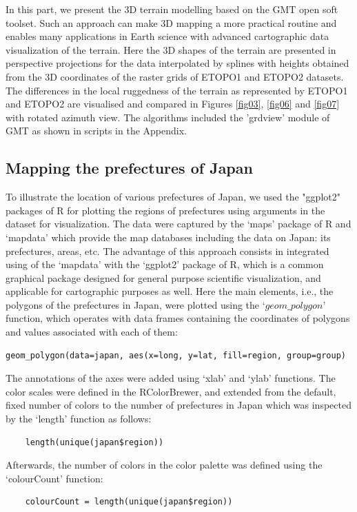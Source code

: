 \documentclass[land,article,submit,pdftex,moreauthors]{Definitions/mdpi}
\begin{document}
In this part, we present the 3D terrain modelling based on the GMT open soft toolset. Such an approach can make 3D mapping a more practical routine and enables many applications in Earth science with advanced cartographic data visualization of the terrain. Here the 3D shapes of the terrain are presented in perspective projections for the data interpolated by splines with heights obtained from the 3D coordinates of the raster grids of ETOPO1 and ETOPO2 datasets.  The differences in the local ruggedness of the terrain as represented by ETOPO1 and ETOPO2 are visualised and compared in Figures \ref{fig03}, \ref{fig06} and \ref{fig07} with rotated azimuth view. The algorithms included the 'grdview' module of GMT as shown in scripts in the Appendix. 

\subsection{Mapping the prefectures of Japan}

To illustrate the location of various prefectures of Japan, we used the "ggplot2" packages of R for plotting the regions of prefectures using arguments in the dataset for visualization. The data were captured by the ‘maps’ package of R \cite{Beckeretal2013} and ‘mapdata’ which provide the map databases including the data on Japan: its prefectures, areas, etc. The advantage of this approach consists in integrated using of the ‘mapdata’ with the ‘ggplot2’ package of R, which is a common graphical package designed for general purpose scientific visualization, and applicable for cartographic purposes as well. Here the main elements, i.e., the polygons of the prefectures in Japan, were plotted using the $‘geom\_polygon’$ function, which operates with data frames containing the coordinates of polygons and values associated with each of them: 
\begin{verbatim}geom_polygon(data=japan, aes(x=long, y=lat, fill=region, group=group)\end{verbatim} 

The annotations of the axes were added using ‘xlab’ and ‘ylab’ functions. The color scales were defined in the RColorBrewer, and extended from the default, fixed number of colors to the number of prefectures in Japan which was inspected by the ‘length’ function as follows: 
\begin{verbatim}
	length(unique(japan$region))
\end{verbatim} 
Afterwards, the number of colors in the color palette was defined using the ‘colourCount’ function: 
\begin{verbatim}
	colourCount = length(unique(japan$region))
\end{verbatim}
\end{document}
